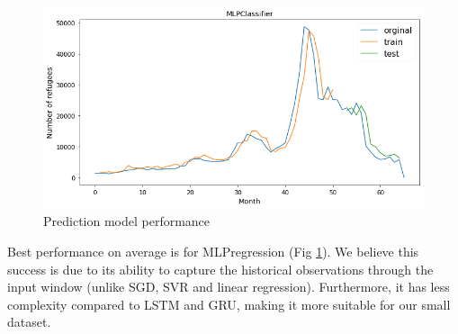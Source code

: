 \begin{figure}[!ht]
\centering
 \caption{Prediction model performance}
 \label{fig:mlp}
 \includegraphics[height=0.5\columnwidth,width=0.9\columnwidth]{img/mlp_step_1}
\end{figure}

Best performance on average is for MLPregression (Fig \ref{fig:mlp}). We believe this success is due to its ability to capture the historical observations through the input window (unlike SGD, SVR and linear regression). Furthermore, it has less complexity compared to LSTM and GRU, making it more suitable for our small dataset.


